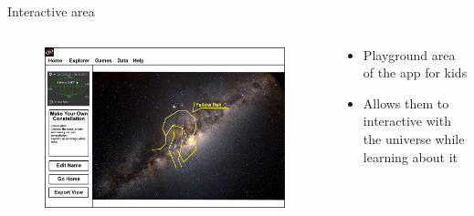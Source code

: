\documentclass[9pt]{beamer}
\begin{document}
\begin{frame}{Interactive area}

    \begin{columns}[c, onlytextwidth]

        \begin{column}{0.7\textwidth}

            \begin{figure}[H]
                \includegraphics[width=\textwidth]{./img/games.jpg}
            \end{figure}

        \end{column}
        \hfill
        \begin{column}{0.28\textwidth}

            \begin{itemize}
                \item Playground area of the app for kids
                \item Allows them to interactive with the universe while learning about it
            \end{itemize}

        \end{column}

    \end{columns}

\end{frame}
\end{document}
